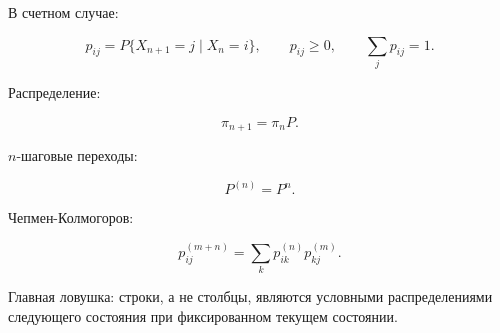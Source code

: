 \documentclass[
  11pt,
  a4paper,
]{article}
\begin{document}
В счетном случае:

\[
p_{ij}=P\{X_{n+1}=j\mid X_n=i\},
\qquad
p_{ij}\ge0,
\qquad
\sum_jp_{ij}=1.
\]

Распределение:

\[
\pi_{n+1}=\pi_nP.
\]

\(n\)-шаговые переходы:

\[
P^{(n)}=P^n.
\]

Чепмен-Колмогоров:

\[
p_{ij}^{(m+n)}
=
\sum_kp_{ik}^{(n)}p_{kj}^{(m)}.
\]

Главная ловушка: строки, а не столбцы, являются условными
распределениями следующего состояния при фиксированном текущем
состоянии.

\newpage
\end{document}
